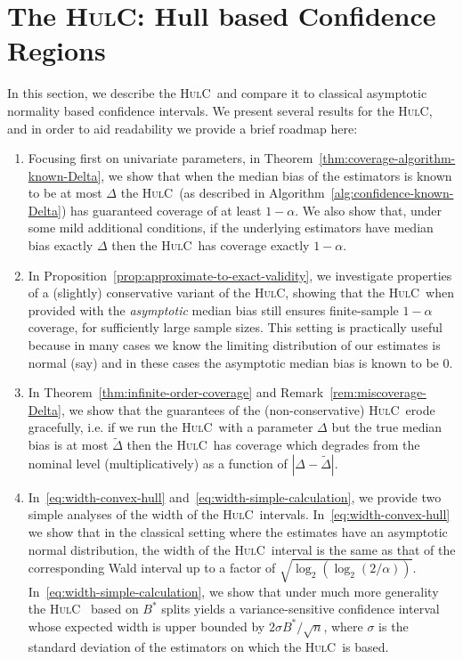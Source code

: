 \documentclass{article}
\newcommand{\hulc}{\textsc{HulC}~}
\newcommand{\hulcnospace}{\textsc{HulC}}
\numberwithin{myalgctr}{section}
\begin{document}
\section{The \hulcnospace: Hull based Confidence Regions}\label{sec:convex-hull}
In this section, we describe the \hulc and compare it to classical asymptotic normality based confidence intervals. 
We present several results for the \hulcnospace, and in order to aid readability we provide a brief roadmap here:
\begin{enumerate}
\item Focusing first on univariate parameters, in Theorem~\ref{thm:coverage-algorithm-known-Delta}, we show that when the median bias of the estimators is known to be at most $\Delta$ the \hulc (as described in Algorithm~\ref{alg:confidence-known-Delta}) has guaranteed coverage 
of at least $1 - \alpha$. We also show that, under some mild additional conditions, if the underlying estimators have median bias exactly $\Delta$ then the \hulc has coverage exactly $1 - \alpha$. 
\item In Proposition~\ref{prop:approximate-to-exact-validity}, we investigate properties of a (slightly) conservative variant of the \hulcnospace, showing that the \hulc when provided with the \emph{asymptotic} median bias still ensures finite-sample $1-\alpha$ coverage, for sufficiently large sample sizes.
This setting is practically useful because in many cases we know the limiting distribution of our estimates is normal (say) and in these cases 
the asymptotic median bias is known to be 0.

\item In Theorem~\ref{thm:infinite-order-coverage} and Remark~\ref{rem:miscoverage-Delta}, we show that the guarantees of the (non-conservative) \hulc erode gracefully, i.e. if we run the \hulc with a parameter $\Delta$ but the true median bias is at most $\widetilde{\Delta}$
then the \hulc has coverage which degrades from the nominal level (multiplicatively) as a function of $|\Delta - \widetilde{\Delta}|$.

\item In~\eqref{eq:width-convex-hull} and~\eqref{eq:width-simple-calculation}, we provide two simple analyses of the width of the \hulc intervals. In~\eqref{eq:width-convex-hull} we show that in the classical setting where the estimates have an asymptotic normal distribution, 
the width of the \hulc interval is the same as that of the corresponding Wald interval up to a factor of $\sqrt{\log_2(\log_2(2/\alpha))}$. In~\eqref{eq:width-simple-calculation}, we show that under much more generality the \hulc
based on $B^*$ splits yields a variance-sensitive confidence interval whose expected width is upper bounded by $2 \sigma B^*/\sqrt{n}$, where $\sigma$ is the standard deviation of the estimators on which the \hulc is based.


\end{enumerate}
\end{document}

